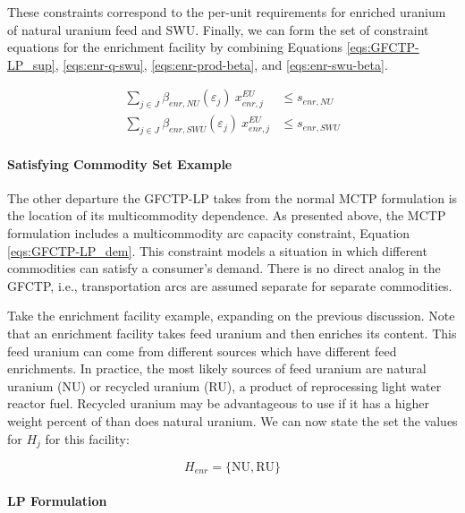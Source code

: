 These constraints correspond to the per-unit requirements for enriched uranium
of natural uranium feed and SWU. Finally, we can form the set of constraint
equations for the enrichment facility by combining
Equations \ref{eqs:GFCTP-LP_sup}, \ref{eqs:enr-q-swu},
\ref{eqs:enr-prod-beta}, and \ref{eqs:enr-swu-beta}.

\begin{align}
\label{eqs:enr-prod-constr}
\sum_{j \in J}\beta_{enr,NU}(\varepsilon_{j}) \: x_{enr,j}^{EU}  & \leq s_{enr,NU} \\
\label{eqs:enr-swu-constr}
\sum_{j \in J}\beta_{enr,SWU}(\varepsilon_{j}) \: x_{enr,j}^{EU} & \leq s_{enr,SWU}
\end{align}

\paragraph{Satisfying Commodity Set Example}

The other departure the GFCTP-LP takes from the normal MCTP formulation is the
location of its multicommodity dependence. As presented above, the
MCTP formulation includes a multicommodity arc capacity constraint, Equation
\ref{eqs:GFCTP-LP_dem}. This constraint models a
situation in which different commodities can satisfy a consumer's demand. There
is no direct analog in the GFCTP, i.e., transportation arcs are assumed separate
for separate commodities.

Take the enrichment facility example, expanding on the previous discussion. Note
that an enrichment facility takes feed uranium and then enriches its 
content. This feed uranium can come from different sources which have different
feed enrichments. In practice, the most likely sources of feed uranium are
natural uranium (NU) or recycled uranium (RU), a product of reprocessing light
water reactor fuel. Recycled uranium may be advantageous to use if it has a
higher weight percent of  than does natural uranium. We can now state the
set the values for $H_{j}$ for this facility:

\begin{equation}\label{eqs:enr-dem-commods}
  H_{enr} = \{ \mbox{NU}, \mbox{RU} \}
\end{equation}

\paragraph{LP Formulation}

